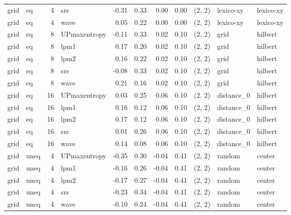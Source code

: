 \begin{tabular}{llrlrrrrlll}
  grid &    eq &  4 &          srs & -0.31 &     0.33 &   0.00 &       0.00 & (2, 2) &   lexico-xy &  lexico-xy \\
  grid &    eq &  4 &         wave &  0.05 &     0.22 &   0.00 &       0.00 & (2, 2) &   lexico-xy &  lexico-xy \\
  grid &    eq &  8 & UPmaxentropy & -0.11 &     0.33 &   0.02 &       0.10 & (2, 2) &        grid &    hilbert \\
  grid &    eq &  8 &         lpm1 &  0.17 &     0.20 &   0.02 &       0.10 & (2, 2) &        grid &    hilbert \\
  grid &    eq &  8 &         lpm2 &  0.16 &     0.22 &   0.02 &       0.10 & (2, 2) &        grid &    hilbert \\
  grid &    eq &  8 &          srs & -0.08 &     0.33 &   0.02 &       0.10 & (2, 2) &        grid &    hilbert \\
  grid &    eq &  8 &         wave &  0.21 &     0.16 &   0.02 &       0.10 & (2, 2) &        grid &    hilbert \\
  grid &    eq & 16 & UPmaxentropy &  0.03 &     0.25 &   0.06 &       0.10 & (2, 2) &  distance_0 &    hilbert \\
  grid &    eq & 16 &         lpm1 &  0.16 &     0.12 &   0.06 &       0.10 & (2, 2) &  distance_0 &    hilbert \\
  grid &    eq & 16 &         lpm2 &  0.17 &     0.12 &   0.06 &       0.10 & (2, 2) &  distance_0 &    hilbert \\
  grid &    eq & 16 &          srs &  0.01 &     0.26 &   0.06 &       0.10 & (2, 2) &  distance_0 &    hilbert \\
  grid &    eq & 16 &         wave &  0.14 &     0.08 &   0.06 &       0.10 & (2, 2) &  distance_0 &    hilbert \\
  grid &  uneq &  4 & UPmaxentropy & -0.35 &     0.30 &  -0.04 &       0.41 & (2, 2) &      random &     center \\
  grid &  uneq &  4 &         lpm1 & -0.16 &     0.26 &  -0.04 &       0.41 & (2, 2) &      random &     center \\
  grid &  uneq &  4 &         lpm2 & -0.17 &     0.27 &  -0.04 &       0.41 & (2, 2) &      random &     center \\
  grid &  uneq &  4 &          srs & -0.23 &     0.34 &  -0.04 &       0.41 & (2, 2) &      random &     center \\
  grid &  uneq &  4 &         wave & -0.10 &     0.24 &  -0.04 &       0.41 & (2, 2) &      random &     center \\

\end{tabular}
